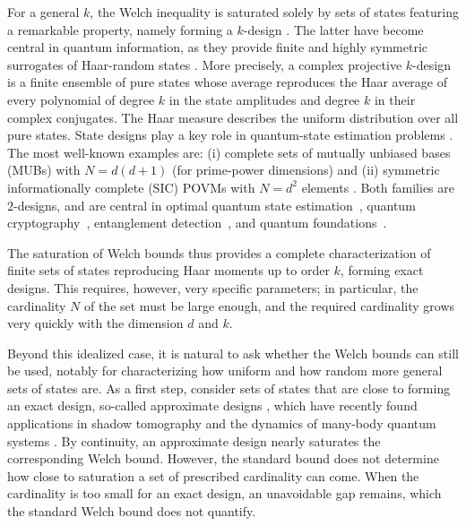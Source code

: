 \documentclass[aps,twocolumn,pra,superscriptaddress,nofootinbib]{revtex4-2}
\begin{document}
{For a general $k$, the Welch inequality is saturated solely by sets of states featuring a remarkable property, namely forming a $k$-design \cite{klappenecker2005,Roy2007}. The latter} have become central in quantum information, {as} they provide finite {and highly symmetric} surrogates of Haar-random states \cite{ambainis2007}. {More precisely, a complex projective $k$-design is a finite ensemble of pure states whose average reproduces the Haar average of every polynomial of degree $k$ in the state amplitudes and degree $k$ in their complex conjugates. The Haar measure describes the uniform distribution over all pure states. State designs play a key role in quantum-state estimation problems \cite{Zhu2022}. The most well-known examples are: (i)} complete sets of {mutually unbiased bases (MUBs) with} $N=d(d+1)$ {(for prime-power dimensions) \cite{woottersMUB} and (ii) symmetric informationally complete (SIC) POVMs with} $N=d^2$ {elements} \cite{renes2004symmetric}. Both families are {$2$-designs, and are} central in optimal quantum state estimation~\cite{woottersMUB,Zhu2022}, quantum cryptography~\cite{Cerf2002,Tavakoli2020}, entanglement detection~\cite{Spengler2012}, and quantum foundations~\cite{Fuchs2017}.






{The saturation of Welch bounds thus provides a complete characterization of finite sets of states reproducing Haar moments up to order $k$, forming exact designs. This requires, however, very specific parameters; in particular, the cardinality $N$ of the set must be large enough, and the required cardinality grows very quickly with the dimension $d$ and $k$.}

{Beyond this idealized case, it is natural to ask whether the Welch bounds can still be used, notably for characterizing how uniform and how random more general sets of states are. As a first step, consider sets of states that are close to forming an exact design, so-called approximate designs \cite{ambainis2007}, which have recently found applications in shadow tomography \cite{Huang2020Predicting,Innocenti2023} and the dynamics of many-body quantum systems \cite{Cottler2023}. By continuity, an approximate design nearly saturates the corresponding Welch bound.
However, the standard bound does not determine how close to saturation
a set of prescribed cardinality can come. When the cardinality is too
small for an exact design, an unavoidable gap remains, which the
standard Welch bound does not quantify.}
\end{document}
